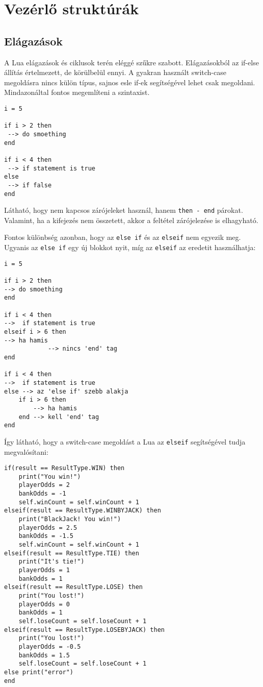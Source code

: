 \section{Vezérlő struktúrák}
\label{sec:l_control}

\subsection{Elágazások}
\label{subsec:l_if}

A Lua elágazások és ciklusok terén eléggé szűkre szabott. Elágazásokból az if-else állítás értelmezett, de körülbelül ennyi. A gyakran használt switch-case megoldásra nincs külön típus, sajnos esle if-ek segítségével lehet csak megoldani. Mindazonáltal fontos megemlíteni a szintaxist.
\scriptsize
\begin{lstlisting}
i = 5

if i > 2 then 
 --> do smoething
end

if i < 4 then
 --> if statement is true
else
 --> if false
end
\end{lstlisting}
\normalsize
Látható, hogy nem kapcsos zárójeleket használ, hanem \verb|then - end| párokat. Valamint, ha a kifejezés nem összetett, akkor a feltétel zárójelezése is elhagyható. 

Fontos különbség azonban, hogy az \verb|else if| és az \verb|elseif| nem egyezik meg. Ugyanis az \verb|else if| egy új blokkot nyit, míg az \verb|elseif| az eredetit használhatja:
\scriptsize
\begin{lstlisting}
i = 5

if i > 2 then 
--> do smoething
end

if i < 4 then
-->  if statement is true
elseif i > 6 then
--> ha hamis
			--> nincs 'end' tag
end

if i < 4 then
-->  if statement is true
else --> az 'else if' szebb alakja
	if i > 6 then
		--> ha hamis
	end --> kell 'end' tag
end
\end{lstlisting}
\normalsize
\newpage
Így látható, hogy a switch-case megoldást a Lua az \verb|elseif| segítségével tudja megvalósítani:
\scriptsize
\begin{lstlisting}
if(result == ResultType.WIN) then
	print("You win!")
	playerOdds = 2
	bankOdds = -1
	self.winCount = self.winCount + 1
elseif(result == ResultType.WINBYJACK) then
	print("BlackJack! You win!")
	playerOdds = 2.5
	bankOdds = -1.5
	self.winCount = self.winCount + 1
elseif(result == ResultType.TIE) then
	print("It's tie!")
	playerOdds = 1
	bankOdds = 1
elseif(result == ResultType.LOSE) then
	print("You lost!")
	playerOdds = 0
	bankOdds = 1
	self.loseCount = self.loseCount + 1
elseif(result == ResultType.LOSEBYJACK) then
	print("You lost!")
	playerOdds = -0.5
	bankOdds = 1.5
	self.loseCount = self.loseCount + 1
else print("error")
end
\end{lstlisting}
\normalsize

